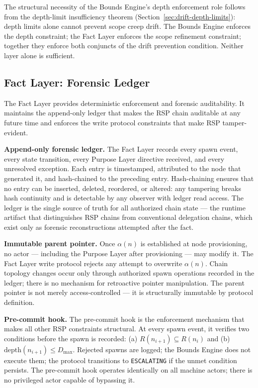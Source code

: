 \medskip
The structural necessity of the Bounds Engine's depth enforcement role follows from the depth-limit insufficiency theorem (Section~\ref{sec:drift-depth-limits}): depth limits alone cannot prevent scope creep drift. The Bounds Engine enforces the depth constraint; the Fact Layer enforces the scope refinement constraint; together they enforce both conjuncts of the drift prevention condition. Neither layer alone is sufficient.

\subsection{Fact Layer: Forensic Ledger}
\label{sec:rs-fact-ledger}

The Fact Layer provides deterministic enforcement and forensic auditability. It maintains the append-only ledger that makes the RSP chain auditable at any future time and enforces the write protocol constraints that make RSP tamper-evident.

\medskip
\noindent\textbf{Append-only forensic ledger.} The Fact Layer records every spawn event, every state transition, every Purpose Layer directive received, and every unresolved exception. Each entry is timestamped, attributed to the node that generated it, and hash-chained to the preceding entry. Hash-chaining ensures that no entry can be inserted, deleted, reordered, or altered: any tampering breaks hash continuity and is detectable by any observer with ledger read access. The ledger is the single source of truth for all authorized chain state — the runtime artifact that distinguishes RSP chains from conventional delegation chains, which exist only as forensic reconstructions attempted after the fact.

\medskip
\noindent\textbf{Immutable parent pointer.} Once $\alpha(n)$ is established at node provisioning, no actor — including the Purpose Layer after provisioning — may modify it. The Fact Layer write protocol rejects any attempt to overwrite $\alpha(n)$. Chain topology changes occur only through authorized spawn operations recorded in the ledger; there is no mechanism for retroactive pointer manipulation. The parent pointer is not merely access-controlled — it is structurally immutable by protocol definition.

\medskip
\noindent\textbf{Pre-commit hook.} The pre-commit hook is the enforcement mechanism that makes all other RSP constraints structural. At every spawn event, it verifies two conditions before the spawn is recorded: (a) $R(n_{i+1}) \subseteq R(n_i)$ and (b) $\mathrm{depth}(n_{i+1}) \leq D_{\mathrm{max}}$. Rejected spawns are logged; the Bounds Engine does not execute them; the protocol transitions to \texttt{ESCALATING} if the unmet condition persists. The pre-commit hook operates identically on all machine actors; there is no privileged actor capable of bypassing it.

